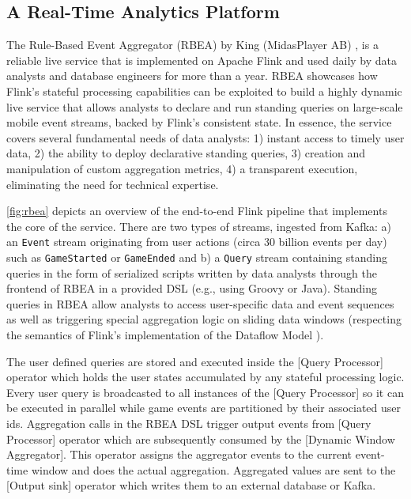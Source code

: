 



\subsection{A Real-Time Analytics Platform}

The Rule-Based Event Aggregator (RBEA) by King (MidasPlayer AB) \cite{CUSTOM:web/kingrbea}, is a reliable live service that is implemented on Apache Flink and used daily by data analysts and database engineers for more than a year. RBEA showcases how Flink's stateful processing capabilities can be exploited to build a highly dynamic live service that allows analysts to declare and run standing queries on large-scale mobile event streams, backed by Flink's consistent state. In essence, the service covers several fundamental needs of data analysts: 1) instant access to timely user data, 2) the ability to deploy declarative standing queries, 3) creation and manipulation of custom aggregation metrics, 4) a transparent execution, eliminating the need for technical expertise.

\autoref{fig:rbea} depicts an overview of the end-to-end Flink pipeline that implements the core of the service. There are two types of streams, ingested from Kafka: a) an \texttt{Event} stream originating from  user actions (circa 30 billion events per day) such as \texttt{GameStarted} or \texttt{GameEnded} and b) a \texttt{Query} stream containing standing queries in the form of serialized scripts written by data analysts through the frontend of RBEA in a provided DSL (e.g., using Groovy or Java). Standing queries in RBEA allow analysts to access user-specific data and event sequences as well as triggering special aggregation logic on sliding data windows (respecting the semantics of Flink's implementation of the Dataflow Model \cite{akidau2015dataflow}). 

The user defined queries are stored and executed inside the [Query Processor] operator which holds the user states accumulated by any stateful processing logic. Every user query is broadcasted to all instances of the [Query Processor] so it can be executed in parallel while game events are partitioned by their associated user ids. Aggregation calls in the RBEA DSL trigger output events from [Query Processor] operator which are subsequently consumed by the [Dynamic Window Aggregator]. This operator assigns the aggregator events to the current event-time window and does the actual aggregation. Aggregated values are sent to the [Output sink] operator which writes them to an external database or Kafka.

